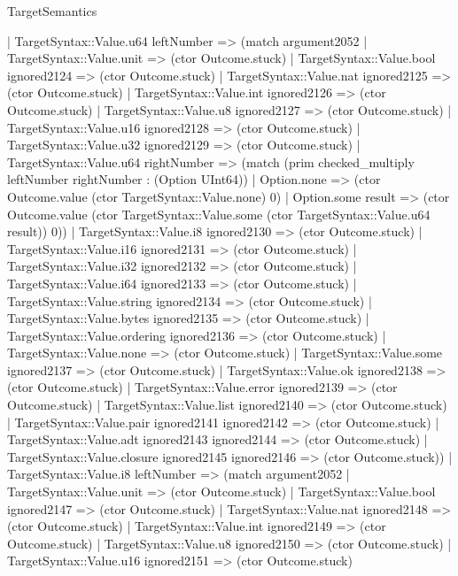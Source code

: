 \begin{lexlean}{TargetSemantics}
\begin{semanticmodule}
{            | TargetSyntax::Value.u64 leftNumber => (match argument2052
              | TargetSyntax::Value.unit => (ctor Outcome.stuck)
              | TargetSyntax::Value.bool ignored2124 => (ctor Outcome.stuck)
              | TargetSyntax::Value.nat ignored2125 => (ctor Outcome.stuck)
              | TargetSyntax::Value.int ignored2126 => (ctor Outcome.stuck)
              | TargetSyntax::Value.u8 ignored2127 => (ctor Outcome.stuck)
              | TargetSyntax::Value.u16 ignored2128 => (ctor Outcome.stuck)
              | TargetSyntax::Value.u32 ignored2129 => (ctor Outcome.stuck)
              | TargetSyntax::Value.u64 rightNumber => (match (prim checked_multiply leftNumber rightNumber : (Option UInt64))
                | Option.none => (ctor Outcome.value (ctor TargetSyntax::Value.none) 0)
                | Option.some result => (ctor Outcome.value (ctor TargetSyntax::Value.some (ctor TargetSyntax::Value.u64 result)) 0))
              | TargetSyntax::Value.i8 ignored2130 => (ctor Outcome.stuck)
              | TargetSyntax::Value.i16 ignored2131 => (ctor Outcome.stuck)
              | TargetSyntax::Value.i32 ignored2132 => (ctor Outcome.stuck)
              | TargetSyntax::Value.i64 ignored2133 => (ctor Outcome.stuck)
              | TargetSyntax::Value.string ignored2134 => (ctor Outcome.stuck)
              | TargetSyntax::Value.bytes ignored2135 => (ctor Outcome.stuck)
              | TargetSyntax::Value.ordering ignored2136 => (ctor Outcome.stuck)
              | TargetSyntax::Value.none => (ctor Outcome.stuck)
              | TargetSyntax::Value.some ignored2137 => (ctor Outcome.stuck)
              | TargetSyntax::Value.ok ignored2138 => (ctor Outcome.stuck)
              | TargetSyntax::Value.error ignored2139 => (ctor Outcome.stuck)
              | TargetSyntax::Value.list ignored2140 => (ctor Outcome.stuck)
              | TargetSyntax::Value.pair ignored2141 ignored2142 => (ctor Outcome.stuck)
              | TargetSyntax::Value.adt ignored2143 ignored2144 => (ctor Outcome.stuck)
              | TargetSyntax::Value.closure ignored2145 ignored2146 => (ctor Outcome.stuck))
            | TargetSyntax::Value.i8 leftNumber => (match argument2052
              | TargetSyntax::Value.unit => (ctor Outcome.stuck)
              | TargetSyntax::Value.bool ignored2147 => (ctor Outcome.stuck)
              | TargetSyntax::Value.nat ignored2148 => (ctor Outcome.stuck)
              | TargetSyntax::Value.int ignored2149 => (ctor Outcome.stuck)
              | TargetSyntax::Value.u8 ignored2150 => (ctor Outcome.stuck)
              | TargetSyntax::Value.u16 ignored2151 => (ctor Outcome.stuck)
}
\end{semanticmodule}
\end{lexlean}
